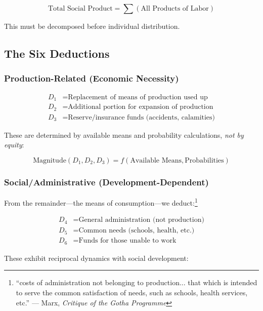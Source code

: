 \documentclass[12pt,a4paper]{article}
\begin{document}
\begin{equation}
\text{Total Social Product} = \sum(\text{All Products of Labor})
\end{equation}

This must be decomposed before individual distribution.

\subsection{The Six Deductions}

\subsubsection{Production-Related (Economic Necessity)}

\begin{align}
D_1 &= \text{Replacement of means of production used up} \\
D_2 &= \text{Additional portion for expansion of production} \\
D_3 &= \text{Reserve/insurance funds (accidents, calamities)}
\end{align}

These are determined by available means and probability calculations, \textit{not by equity}:

\begin{equation}
\text{Magnitude}(D_1, D_2, D_3) = f(\text{Available Means}, \text{Probabilities})
\end{equation}

\subsubsection{Social/Administrative (Development-Dependent)}

From the remainder—the means of consumption—we deduct:\footnote{``costs of administration not belonging to production... that which is intended to serve the common satisfaction of needs, such as schools, health services, etc.'' --- Marx, \textit{Critique of the Gotha Programme}}

\begin{align}
D_4 &= \text{General administration (not production)} \\
D_5 &= \text{Common needs (schools, health, etc.)} \\
D_6 &= \text{Funds for those unable to work}
\end{align}

These exhibit reciprocal dynamics with social development:
\end{document}
